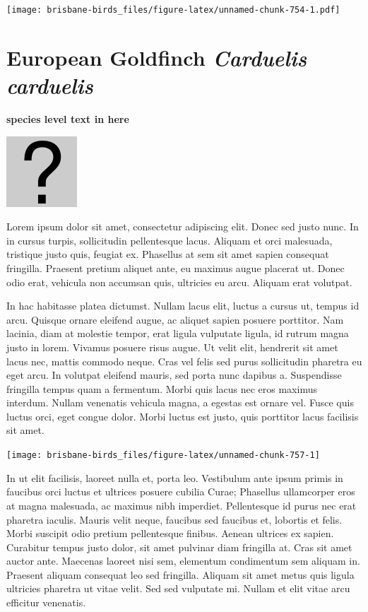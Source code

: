 \documentclass[]{book}
\let\origfigure\figure
\let\endorigfigure\endfigure
\renewenvironment{figure}[1][2] {
  \expandafter\origfigure\expandafter[H]
} {
  \endorigfigure
}
\begin{document}
\texttt{[image: brisbane-birds\_files/figure-latex/unnamed-chunk-754-1.pdf]}

\section{\texorpdfstring{European Goldfinch \emph{Carduelis
carduelis}}{European Goldfinch Carduelis carduelis}}\label{european-goldfinch-carduelis-carduelis}

\textbf{species level text in here}

\begin{figure}
\centering
\includegraphics{assets/missing.png}
\caption{No image for species}
\end{figure}

Lorem ipsum dolor sit amet, consectetur adipiscing elit. Donec sed justo
nunc. In in cursus turpis, sollicitudin pellentesque lacus. Aliquam et
orci malesuada, tristique justo quis, feugiat ex. Phasellus at sem sit
amet sapien consequat fringilla. Praesent pretium aliquet ante, eu
maximus augue placerat ut. Donec odio erat, vehicula non accumsan quis,
ultricies eu arcu. Aliquam erat volutpat.

In hac habitasse platea dictumst. Nullam lacus elit, luctus a cursus ut,
tempus id arcu. Quisque ornare eleifend augue, ac aliquet sapien posuere
porttitor. Nam lacinia, diam at molestie tempor, erat ligula vulputate
ligula, id rutrum magna justo in lorem. Vivamus posuere risus augue. Ut
velit elit, hendrerit sit amet lacus nec, mattis commodo neque. Cras vel
felis sed purus sollicitudin pharetra eu eget arcu. In volutpat eleifend
mauris, sed porta nunc dapibus a. Suspendisse fringilla tempus quam a
fermentum. Morbi quis lacus nec eros maximus interdum. Nullam venenatis
vehicula magna, a egestas est ornare vel. Fusce quis luctus orci, eget
congue dolor. Morbi luctus est justo, quis porttitor lacus facilisis sit
amet.

\begin{figure}
\texttt{[image: brisbane-birds\_files/figure-latex/unnamed-chunk-757-1]} \caption{insert figure caption}\label{fig:unnamed-chunk-757}
\end{figure}

In ut elit facilisis, laoreet nulla et, porta leo. Vestibulum ante ipsum
primis in faucibus orci luctus et ultrices posuere cubilia Curae;
Phasellus ullamcorper eros at magna malesuada, ac maximus nibh
imperdiet. Pellentesque id purus nec erat pharetra iaculis. Mauris velit
neque, faucibus sed faucibus et, lobortis et felis. Morbi suscipit odio
pretium pellentesque finibus. Aenean ultrices ex sapien. Curabitur
tempus justo dolor, sit amet pulvinar diam fringilla at. Cras sit amet
auctor ante. Maecenas laoreet nisi sem, elementum condimentum sem
aliquam in. Praesent aliquam consequat leo sed fringilla. Aliquam sit
amet metus quis ligula ultricies pharetra ut vitae velit. Sed sed
vulputate mi. Nullam et elit vitae arcu efficitur venenatis.
\end{document}

